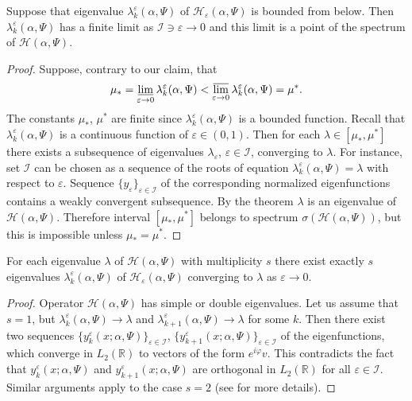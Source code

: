 \documentclass[11pt,english]{amsart}%
\begin{document}
\begin{g_corollary}\label{Corr1}
Suppose that  eigenvalue $\lambda_k^\varepsilon(\alpha, \Psi)$ of $\mathcal{H}_{\varepsilon}(\alpha,\Psi)$ is bounded from below. Then $\lambda_k^\varepsilon(\alpha, \Psi)$ has a finite limit as $\mathcal{I}\ni \varepsilon\to 0$
and this limit is a point of the spectrum  of $\mathcal{H}(\alpha,\Psi)$.
\end{g_corollary}
\begin{proof}
Suppose, contrary to our claim, that
\begin{equation*}
    \mu_*=\varliminf_{\varepsilon\to 0}\lambda_k^\varepsilon(\alpha, \Psi)<\varlimsup_{\varepsilon\to 0}\lambda_k^\varepsilon(\alpha, \Psi)=\mu^*.
  \end{equation*}
The constants $\mu_*$, $\mu^*$ are finite since $\lambda_k^\varepsilon(\alpha, \Psi)$ is a bounded function.
Recall that $\lambda_k^\varepsilon(\alpha, \Psi)$ is a continuous function of $\varepsilon\in (0,1)$.
Then for each $\lambda\in [\mu_*,\mu^*]$ there exists  a subsequence of eigenvalues $\lambda_\varepsilon$, $\varepsilon\in \mathcal{I}$, converging to $\lambda$. For instance, set $\mathcal{I}$ can be chosen
as a sequence of the roots of  equation  $\lambda_k^\varepsilon(\alpha, \Psi)=\lambda$ with respect to $\varepsilon$.
Sequence $\{y_\varepsilon\}_{\varepsilon\in \mathcal{I}}$ of the corresponding normalized eigenfunctions contains a weakly convergent subsequence. By the theorem  $\lambda$ is an eigenvalue of  $\mathcal{H}(\alpha,\Psi)$.
Therefore interval $[\mu_*,\mu^*]$ belongs to spectrum $\sigma(\mathcal{H}(\alpha,\Psi))$, but this is impossible unless $\mu_*=\mu^*$.
\end{proof}















\begin{g_corollary}\label{Corr2} For each eigenvalue $\lambda$ of  $\mathcal{H}(\alpha,\Psi)$ with multiplicity $s$ there exist exactly $s$ eigenvalues $\lambda_k^\varepsilon(\alpha, \Psi)$ of $\mathcal{H}_{\varepsilon}(\alpha,\Psi)$
converging to $\lambda$ as $\varepsilon\to 0$.
\end{g_corollary}
\begin{proof} Operator $\mathcal{H}(\alpha,\Psi)$ has  simple or double eigenvalues.
Let us assume  that $s=1$, but  $\lambda_k^\varepsilon(\alpha, \Psi)\to \lambda$ and  $\lambda_{k+1}^\varepsilon(\alpha, \Psi)\to \lambda$ for some $k$. Then there exist two sequences $\{y_k^{\varepsilon}(x;\alpha, \Psi)\}_{\varepsilon\in \mathcal{I}}$, $\{y_{k+1}^{\varepsilon}(x;\alpha, \Psi)\}_{\varepsilon\in \mathcal{I}}$ of the eigenfunctions, which  converge in $L_2(\mathbb{R})$
to   vectors  of the form $e^{i\varphi} v$. This contradicts the fact that $y_k^{\varepsilon}(x;\alpha, \Psi)$
and $y_{k+1}^{\varepsilon}(x;\alpha, \Psi)$ are orthogonal in $L_2(\mathbb{R})$ for all $\varepsilon\in \mathcal{I}$. Similar arguments apply to the case $s=2$ (see \cite{GolovatyMMO} for more details).
\end{proof}
\end{document}
